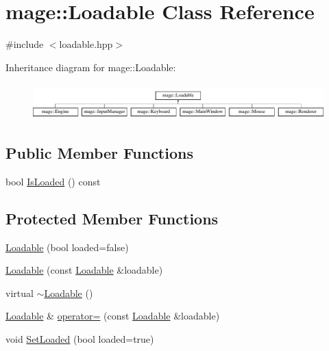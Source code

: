 \hypertarget{classmage_1_1_loadable}{}\section{mage\+:\+:Loadable Class Reference}
\label{classmage_1_1_loadable}


{\ttfamily \#include $<$loadable.\+hpp$>$}

Inheritance diagram for mage\+:\+:Loadable\+:\begin{figure}[H]
\begin{center}
\leavevmode
\includegraphics[height=1.393035cm]{classmage_1_1_loadable}
\end{center}
\end{figure}
\subsection*{Public Member Functions}
\begin{DoxyCompactItemize}
\item 
bool \hyperlink{classmage_1_1_loadable_a53cfa5beb9b44bbcda0d6166a54b8cb6}{Is\+Loaded} () const
\end{DoxyCompactItemize}
\subsection*{Protected Member Functions}
\begin{DoxyCompactItemize}
\item 
\hyperlink{classmage_1_1_loadable_afbdcb287b5e20583899a27a1c244bc7d}{Loadable} (bool loaded=false)
\item 
\hyperlink{classmage_1_1_loadable_aaea04657cc6f150659f0ab387f6a5514}{Loadable} (const \hyperlink{classmage_1_1_loadable}{Loadable} \&loadable)
\item 
virtual \hyperlink{classmage_1_1_loadable_a009ef5ebc9baf803b19110d937922b41}{$\sim$\+Loadable} ()
\item 
\hyperlink{classmage_1_1_loadable}{Loadable} \& \hyperlink{classmage_1_1_loadable_a0bf85c35a57281661a67b5b151621534}{operator=} (const \hyperlink{classmage_1_1_loadable}{Loadable} \&loadable)
\item 
void \hyperlink{classmage_1_1_loadable_a932ff8b287c8e68e30a13804cba08ff2}{Set\+Loaded} (bool loaded=true)
\end{DoxyCompactItemize}
